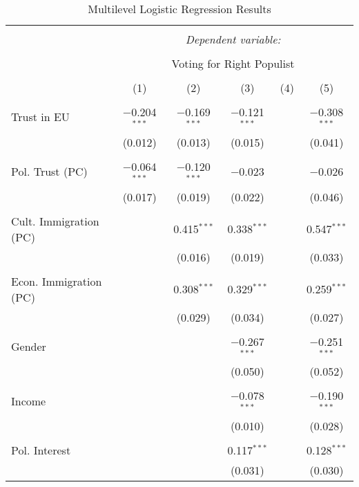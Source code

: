 
\begin{table}[!htbp] \centering 
  \caption{Multilevel Logistic Regression Results} 
  \label{} 
 \scriptsize
\centering
\begin{tabular}{@{\extracolsep{5pt}}lccccc} 
\\[-1.8ex]\hline 
\hline \\[-1.8ex] 
 & \multicolumn{5}{c}{\textit{Dependent variable:}} \\ 
\cline{2-6} 
\\[-1.8ex] & \multicolumn{5}{c}{Voting for Right Populist} \\ 
\\[-1.8ex] & (1) & (2) & (3) & (4) & (5)\\ 
\hline \\[-1.8ex] 
 Trust in EU & $-$0.204$^{***}$ & $-$0.169$^{***}$ & $-$0.121$^{***}$ &  & $-$0.308$^{***}$ \\ 
  & (0.012) & (0.013) & (0.015) &  & (0.041) \\ 
  & & & & & \\ 
 Pol. Trust (PC) & $-$0.064$^{***}$ & $-$0.120$^{***}$ & $-$0.023 &  & $-$0.026 \\ 
  & (0.017) & (0.019) & (0.022) &  & (0.046) \\ 
  & & & & & \\ 
 Cult. Immigration (PC) &  & 0.415$^{***}$ & 0.338$^{***}$ &  & 0.547$^{***}$ \\ 
  &  & (0.016) & (0.019) &  & (0.033) \\ 
  & & & & & \\ 
 Econ. Immigration (PC) &  & 0.308$^{***}$ & 0.329$^{***}$ &  & 0.259$^{***}$ \\ 
  &  & (0.029) & (0.034) &  & (0.027) \\ 
  & & & & & \\ 
 Gender &  &  & $-$0.267$^{***}$ &  & $-$0.251$^{***}$ \\ 
  &  &  & (0.050) &  & (0.052) \\ 
  & & & & & \\ 
 Income &  &  & $-$0.078$^{***}$ &  & $-$0.190$^{***}$ \\ 
  &  &  & (0.010) &  & (0.028) \\ 
  & & & & & \\ 
 Pol. Interest &  &  & 0.117$^{***}$ &  & 0.128$^{***}$ \\ 
  &  &  & (0.031) &  & (0.030) \\ 

\end{tabular}
\end{table}
